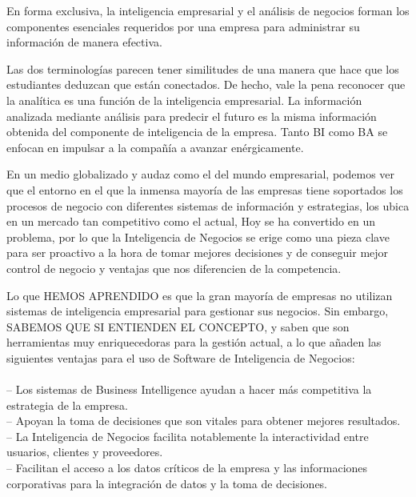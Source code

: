 \documentclass[a4paper,12pt,twocolumn]{article}
\begin{document}
\item En forma exclusiva, la inteligencia empresarial y el análisis de negocios forman los componentes esenciales requeridos por una empresa para administrar su información de manera efectiva.
\textbf{}\\
\item 
Las dos terminologías parecen tener similitudes de una manera que hace que los estudiantes deduzcan que están conectados. De hecho, vale la pena reconocer que la analítica es una función de la inteligencia empresarial. La información analizada mediante análisis para predecir el futuro es la misma información obtenida del componente de inteligencia de la empresa. Tanto BI como BA se enfocan en impulsar a la compañía a avanzar enérgicamente.
\textbf{}\\
\item En un medio globalizado y audaz como el del mundo empresarial, podemos ver que el entorno en el que la inmensa mayoría de las empresas tiene soportados los procesos de negocio con diferentes sistemas de información y estrategias, los ubica en un mercado tan competitivo como el actual, Hoy se ha convertido en un problema, por lo que la Inteligencia de Negocios se erige como una pieza clave para ser proactivo a la hora de tomar mejores decisiones y de conseguir mejor control de negocio y ventajas que nos diferencien de la competencia.
\textbf{}\\
\item Lo que HEMOS APRENDIDO es que la gran mayoría de empresas no utilizan sistemas de inteligencia empresarial para gestionar sus negocios. Sin embargo, SABEMOS QUE SI ENTIENDEN EL CONCEPTO, y saben que son herramientas muy enriquecedoras para la gestión actual, a lo que añaden las siguientes ventajas para el  uso de Software de Inteligencia de Negocios: 
\textbf{}\\
\textbf{}\\
– Los sistemas de Business Intelligence ayudan a hacer más competitiva la estrategia de la empresa.\textbf{}\\

– Apoyan la toma de decisiones que son vitales para obtener mejores resultados.\textbf{}\\

– La Inteligencia de Negocios facilita notablemente la interactividad entre usuarios, clientes y proveedores.\textbf{}\\

– Facilitan el acceso a los datos críticos de la empresa y las informaciones corporativas para la integración de datos y la toma de decisiones.\textbf{}\\
\end{document}
